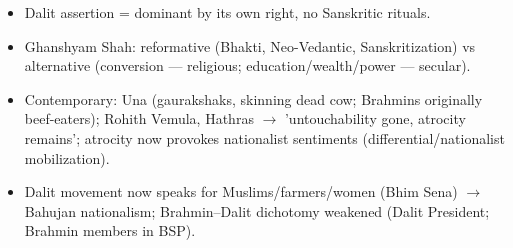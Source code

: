 \begin{QuickRevision}
\begin{itemize}
\item Dalit assertion = dominant by its own right, no Sanskritic rituals.
\item Ghanshyam Shah: reformative (Bhakti, Neo-Vedantic, Sanskritization) vs alternative (conversion --- religious; education/wealth/power --- secular).
\item Contemporary: Una (gaurakshaks, skinning dead cow; Brahmins originally beef-eaters); Rohith Vemula, Hathras $\rightarrow$ 'untouchability gone, atrocity remains'; atrocity now provokes nationalist sentiments (differential/nationalist mobilization).
\item Dalit movement now speaks for Muslims/farmers/women (Bhim Sena) $\rightarrow$ Bahujan nationalism; Brahmin--Dalit dichotomy weakened (Dalit President; Brahmin members in BSP).
\end{itemize}
\end{QuickRevision}

